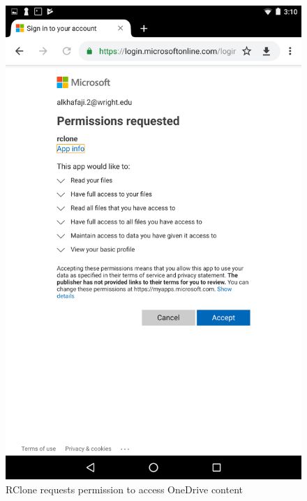 \begin{figure}[htb]
  \centering
  \includegraphics[scale=0.2]{images/onedrive2.png}
  \caption{RClone requests permission to access OneDrive content}
  \label{fig:onedrive2}
\end{figure}
